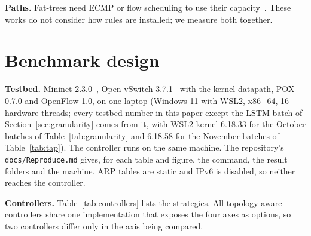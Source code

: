 \documentclass[conference]{IEEEtran}
\begin{document}
\textbf{Paths.} Fat-trees need ECMP or flow scheduling to use their capacity~\cite{alfares,hedera}. These works do not consider how rules are installed; we measure both together.

\section{Benchmark design}\label{sec:design}

\textbf{Testbed.} Mininet 2.3.0~\cite{mininet}, Open vSwitch 3.7.1~\cite{ovs} with the kernel datapath, POX 0.7.0 and OpenFlow 1.0, on one laptop (Windows 11 with WSL2, x86\_64, 16 hardware threads; every testbed number in this paper except the LSTM batch of Section~\ref{sec:granularity} comes from it, with WSL2 kernel 6.18.33 for the October batches of Table~\ref{tab:granularity} and 6.18.58 for the November batches of Table~\ref{tab:tap}). The controller runs on the same machine. The repository's \texttt{docs/Reproduce.md} gives, for each table and figure, the command, the result folders and the machine. ARP tables are static and IPv6 is disabled, so neither reaches the controller.

\textbf{Controllers.} Table~\ref{tab:controllers} lists the strategies. All topology-aware controllers share one implementation that exposes the four axes as options, so two controllers differ only in the axis being compared.
\end{document}
